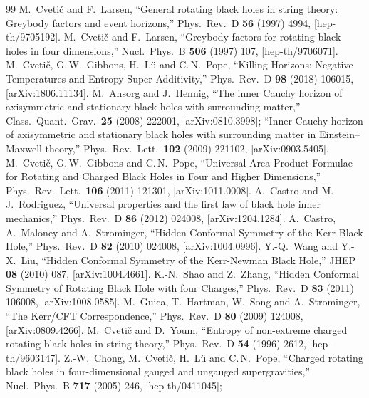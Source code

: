\documentclass[11pt]{article}
\theoremstyle{definition}
\theoremstyle{remark}
\begin{document}
\begin{thebibliography}{99}
 M.~Cveti\v{c} and F.~Larsen,
``General rotating black holes in string theory: Greybody factors and event
horizons,'' Phys.\ Rev.\ D {\bf 56} (1997) 4994, [hep-th/9705192].
 M.~Cveti\v{c} and F.~Larsen,
``Greybody factors for rotating black holes in four dimensions,''
Nucl.\ Phys.\ B {\bf 506} (1997) 107, [hep-th/9706071].
 M.~Cveti\v{c}, G.\,W.~Gibbons, H.~L\"u and C.\,N.~Pope,
``Killing Horizons: Negative Temperatures and Entropy Super-Additivity,''
Phys.\ Rev.\ D {\bf 98} (2018) 106015, [arXiv:1806.11134].
 M.~Ansorg and J.~Hennig,
``The inner Cauchy horizon of axisymmetric and stationary black holes with
surrounding matter,'' Class.\ Quant.\ Grav.\ {\bf 25} (2008) 222001,
[arXiv:0810.3998]; ``Inner Cauchy horizon of axisymmetric and stationary
black holes with surrounding matter in Einstein--Maxwell theory,''
Phys.\ Rev.\ Lett.\ {\bf 102} (2009) 221102, [arXiv:0903.5405].
 M.~Cveti\v{c}, G.\,W.~Gibbons and C.\,N.~Pope,
``Universal Area Product Formulae for Rotating and Charged Black Holes in
Four and Higher Dimensions,'' Phys.\ Rev.\ Lett.\ {\bf 106} (2011) 121301,
[arXiv:1011.0008].
 A.~Castro and M.\,J.~Rodriguez,
``Universal properties and the first law of black hole inner mechanics,''
Phys.\ Rev.\ D {\bf 86} (2012) 024008, [arXiv:1204.1284].
 A.~Castro, A.~Maloney and A.~Strominger,
``Hidden Conformal Symmetry of the Kerr Black Hole,''
Phys.\ Rev.\ D {\bf 82} (2010) 024008, [arXiv:1004.0996].
 Y.-Q.~Wang and Y.-X.~Liu,
``Hidden Conformal Symmetry of the Kerr-Newman Black Hole,''
JHEP {\bf 08} (2010) 087, [arXiv:1004.4661].
 K.-N.~Shao and Z.~Zhang,
``Hidden Conformal Symmetry of Rotating Black Hole with four Charges,''
Phys.\ Rev.\ D {\bf 83} (2011) 106008, [arXiv:1008.0585].
 M.~Guica, T.~Hartman, W.~Song and A.~Strominger,
``The Kerr/CFT Correspondence,''
Phys.\ Rev.\ D {\bf 80} (2009) 124008, [arXiv:0809.4266].
 M.~Cveti\v{c} and D.~Youm,
``Entropy of non-extreme charged rotating black holes in string theory,''
Phys.\ Rev.\ D {\bf 54} (1996) 2612, [hep-th/9603147].
 Z.-W.~Chong, M.~Cveti\v{c}, H.~L\"u and C.\,N.~Pope,
``Charged rotating black holes in four-dimensional gauged and ungauged
supergravities,'' Nucl.\ Phys.\ B {\bf 717} (2005) 246, [hep-th/0411045];

\end{thebibliography}
\end{document}
